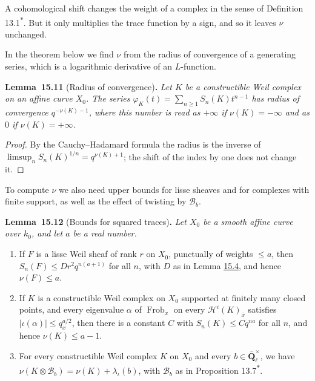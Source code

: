 \documentclass[11pt]{article}
\newenvironment{bpstatement}[2]{\par\addvspace{0.6\baselineskip}\noindent\textbf{#1}#2\textbf{.}\enspace\ignorespaces}
  {\par\addvspace{0.4\baselineskip}}
\newenvironment{bpstatementit}[2]{\begin{bpstatement}{#1}{#2}\itshape\ignorespaces}{\end{bpstatement}}
\newcommand{\bpout}[1]{#1\textsuperscript{\hyperlink{bp-outside}{\ensuremath{\ast}}}}
\begin{document}
\label{bp31}%
A cohomological shift changes the weight of a complex in the sense of Definition \bpout{13.1}. But it only multiplies the trace function by a sign, and so it leaves \(\nu\) unchanged.

In the theorem below we find \(\nu\) from the radius of convergence of a generating series, which is a logarithmic derivative of an \(L\)-function.

\label{bp32}%
\begin{bpstatementit}{Lemma~15.11}{ (Radius of convergence)}
Let \(K\) be a constructible Weil complex on an affine curve \(X_0\). The series \(\varphi_K(t)=\sum_{n\ge1}S_n(K)t^{n-1}\) has radius of convergence \(q^{-\nu(K)-1}\), where this number is read as \(+\infty\) if \(\nu(K)=-\infty\) and as \(0\) if \(\nu(K)=+\infty\).
\end{bpstatementit}

\begin{proof}[{Proof}]\label{bp33}%
By the Cauchy–Hadamard formula the radius is the inverse of \(\limsup_nS_n(K)^{1/n}=q^{\nu(K)+1}\); the shift of the index by one does not change it.
\end{proof}

\label{bp34}%
To compute \(\nu\) we also need upper bounds for lisse sheaves and for complexes with finite support, as well as the effect of twisting by \(\mathcal B_b\).

\label{bp35}%
\begin{bpstatementit}{Lemma~15.12}{ (Bounds for squared traces)}
Let \(X_0\) be a smooth affine curve over \(k_0\), and let \(a\) be a real number.

\begin{enumerate}
\item If \(F\) is a lisse Weil sheaf of rank \(r\) on \(X_0\), punctually of weights \(\le a\), then \(S_n(F)\le Dr^2q^{n(a+1)}\) for all \(n\), with \(D\) as in Lemma \hyperref[bp10]{15.4}, and hence \(\nu(F)\le a\).
\item If \(K\) is a constructible Weil complex on \(X_0\) supported at finitely many closed points, and every eigenvalue \(\alpha\) of \(\operatorname{Frob}_x\) on every \(\mathcal H^i(K)_{\bar x}\) satisfies \(|\iota(\alpha)|\le q_x^{a/2}\), then there is a constant \(C\) with \(S_n(K)\le Cq^{na}\) for all \(n\), and hence \(\nu(K)\le a-1\).
\item For every constructible Weil complex \(K\) on \(X_0\) and every \(b\in\overline{\mathbf Q}_\ell^\times\), we have \(\nu(K\otimes\mathcal B_b)=\nu(K)+\lambda_\iota(b)\), with \(\mathcal B_b\) as in Proposition \bpout{13.7}.
\end{enumerate}
\end{bpstatementit}
\end{document}
